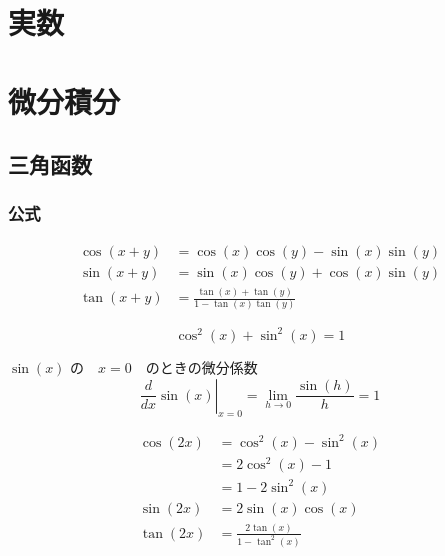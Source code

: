 \documentclass[leqno,autodetect-engine,dvipdfmx-if-dvi,ja=standard,a4paper,12pt]{bxjsbook}
\begin{document}
	\tableofcontents
	\part{実数}
	\part{微分積分}
		\chapter{三角函数}
			\section{公式}
				\begin{thm}[加法定理]
						\begin{align}
							\cos(x+y) &= \cos(x)\cos(y) - \sin(x)\sin(y) \\
							\sin(x+y) &= \sin(x) \cos(y) + \cos(x)\sin(y) \\
							\tan(x+y) &= \frac{\tan(x) + \tan(y)}{1 - \tan(x)\tan(y)}
						\end{align}
				\end{thm}
			
				\begin{thm}[ピタゴラスの基本三角函数公式]
					\begin{equation}
						\cos^2(x) + \sin^2(x) = 1
					\end{equation}
				\end{thm}
			
				\begin{thm} $\sin(x)$ の　$x=0$　のときの微分係数
					\begin{equation}
						\left. \frac{d}{dx} \sin(x)\right\lvert_{x=0} = \lim_{h \to 0} \frac{ \sin(h)} {h} = 1
					\end{equation}
				\end{thm}
			
				\begin{thm}[倍角の公式]
					\begin{align}
						\cos(2x) &= \cos^2(x) - \sin^2(x) \\
						              &= 2 \cos^2(x) -1 \\
						              &= 1 -2 \sin^2(x) \\
						\sin(2x) &= 2\sin(x)\cos(x) \\
						\tan(2x) &= \frac{2\tan(x)} {1 - \tan^2(x)} 
					\end{align}
				\end{thm}
			
\end{document}

